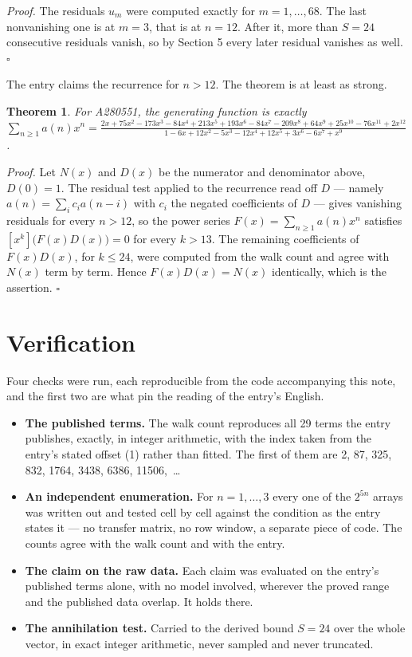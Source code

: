 \documentclass[11pt]{article}
\newtheorem{theorem}{Theorem}
\theoremstyle{definition}
\begin{document}
{\itshape Proof.} The residuals $u_m$ were computed exactly for $m = 1,\dots,68$. The last nonvanishing one is at $m = 3$, that is at $n = 12$. After it, more than $S = 24$ consecutive residuals vanish, so by Section 5 every later residual vanishes as well. $\square$

The entry claims the recurrence for $n > 12$. The theorem is at least as strong.

\begin{theorem} For A280551, the generating function is exactly $\sum_{n\ge 1} a(n)x^n = \frac{2x + 75x^{2} - 173x^{3} - 84x^{4} + 213x^{5} + 193x^{6} - 84x^{7} - 209x^{8} + 64x^{9} + 25x^{10} - 76x^{11} + 2x^{12}}{1 - 6x + 12x^{2} - 5x^{3} - 12x^{4} + 12x^{5} + 3x^{6} - 6x^{7} + x^{9}}$.\end{theorem}

{\itshape Proof.} Let $N(x)$ and $D(x)$ be the numerator and denominator above, $D(0)=1$. The residual test applied to the recurrence read off $D$ --- namely $a(n) = \sum_i c_i a(n-i)$ with $c_i$ the negated coefficients of $D$ --- gives vanishing residuals for every $n > 12$, so the power series $F(x)=\sum_{n\ge 1}a(n)x^n$ satisfies $[x^k]\bigl(F(x)D(x)\bigr) = 0$ for every $k > 13$. The remaining coefficients of $F(x)D(x)$, for $k \le 24$, were computed from the walk count and agree with $N(x)$ term by term. Hence $F(x)D(x) = N(x)$ identically, which is the assertion. $\square$

\section{Verification}

Four checks were run, each reproducible from the code accompanying this note, and the first two are what pin the reading of the entry's English.

\begin{itemize}

\item {\bfseries The published terms.} The walk count reproduces all 29 terms the entry publishes, exactly, in integer arithmetic, with the index taken from the entry's stated offset (1) rather than fitted. The first of them are 2, 87, 325, 832, 1764, 3438, 6386, 11506,~\dots

\item {\bfseries An independent enumeration.} For $n = 1,\dots,3$ every one of the $2^{5n}$ arrays was written out and tested cell by cell against the condition as the entry states it --- no transfer matrix, no row window, a separate piece of code. The counts agree with the walk count and with the entry.

\item {\bfseries The claim on the raw data.} Each claim was evaluated on the entry's published terms alone, with no model involved, wherever the proved range and the published data overlap. It holds there.

\item {\bfseries The annihilation test.} Carried to the derived bound $S = 24$ over the whole vector, in exact integer arithmetic, never sampled and never truncated.

\end{itemize}
\end{document}
